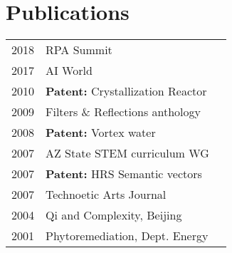 \documentclass[letterpaper]{deedy-resume} %
\begin{document}
\begin{minipage}[t]{0.33\textwidth}
\section{Publications} 

\begin{tabular}{rll}
2018 & RPA Summit\\
2017 & AI World\\
2010 & \textbf{Patent:} Crystallization Reactor\\
2009 & Filters \& Reflections anthology\\
2008 & \textbf{Patent:} Vortex water\\
2007 & AZ State STEM curriculum WG\\
2007 & \textbf{Patent:} HRS Semantic vectors\\
2007 & Technoetic Arts Journal\\
2004 & Qi and Complexity, Beijing\\
2001 & Phytoremediation, Dept. Energy\\
\end{tabular}

\sectionspace %



\end{minipage} %
\hfill
%
%
\end{document}

